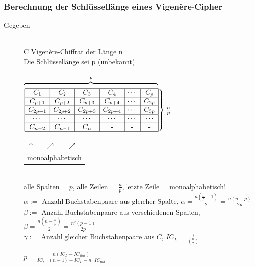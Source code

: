 \documentclass[landscape,twocolumn,a4paper]{article}
\newcommand{\Bold}[1]{\textbf{#1}} %
\newcommand{\T}[1]{\text{#1}} %
\newcommand{\Brackar}[2]{\left.\begin{array}{#1} #2 \end{array}\right\rbrace} %
\begin{document}
\subsubsection{Berechnung der Schlüssellänge eines Vigen\`{e}re-Cipher}
\begin{description}
	\item[Gegeben] \hfill \\
		C Vigenère-Chiffrat der Länge n \\
		Die Schlüssellänge sei p (unbekannt) \\ \\
$\overbrace{\hspace{6.8cm}}^p$\\
$\Brackar{|c|c|c|c|c|c|}{ \hline
 C_1&C_2&C_3&C_4&\cdots&C_p\\\hline
 C_{p+1}&C_{p+2}&C_{p+3}&C_{p+4}&\cdots&C_{2p}\\\hline
 C_{2p+1}&C_{2p+2}&C_{2p+3}&C_{2p+4}&\cdots&C_{3p}\\\hline
 \cdots&\cdots&\cdots&\cdots&\cdots&\cdots\\\hline
 C_{n-2}&C_{n-1}&C_n&\Bold{-}&\Bold{-}&\Bold{-}\\\hline
}\frac{n}{p}$\\
\begin{tabular}{lll}
 $\uparrow$&\hspace{0.5cm}$\nearrow$&\hspace{0.7cm}$\nearrow$\\
 \multicolumn{3}{l}{monoalphabetisch}
\end{tabular}
\\
alle Spalten = $p$, alle Zeilen = $\frac{n}{p}$, letzte Zeile = monoalphabetisch!\\
$\alpha:=$ Anzahl Buchstabenpaare aus gleicher Spalte, $\alpha=\frac{n(\frac{n}{p}-1)}{2}=\frac{n(n-p)}{2p}$\\
$\beta:=$ Anzahl Buchstabenpaare aus verschiedenen Spalten, $\beta=\frac{n(n-\frac{n}{p})}{2}=\frac{n^2(p-1)}{2p}$\\
$\gamma:=$ Anzahl gleicher Buchstabenpaare aus $C$, $IC_L=\frac{\gamma}{{n\choose2}}$\\
\begin{center}
 \fbox{$\gamma=\alpha\cdot IC_L+\beta\cdot IC_{\T{flat}}$}
\end{center}
\begin{center}
 $p=\frac{n(IC_L-IC_{flat})}{IC_C\cdot(n-1)+IC_L-n\cdot IC_{\T{flat}}}$
\end{center}
\end{description}
\end{document}
